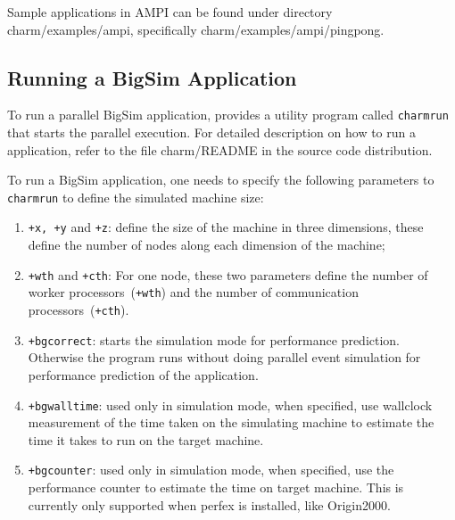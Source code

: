 Sample applications in AMPI can be found under directory
        charm/examples/ampi, specifically charm/examples/ampi/pingpong.

        \subsection{Running a BigSim Application}

        To run a parallel BigSim application, \charmpp{} provides a utility program
        called {\tt charmrun} that starts the parallel execution.
For detailed description on how to run a \charmpp{} application, 
refer to the file charm/README in the source code distribution.

        To run a BigSim application, one needs to specify the following parameters to 
        {\tt charmrun} to define the simulated machine size:
\begin{enumerate}
\item {\tt +x, +y} and {\tt +z}:  define the size of the machine in three dimensions, these define the number of nodes along each dimension of the machine;
\item {\tt +wth} and {\tt +cth}:  For one node, these two parameters define the number of worker processors~({\tt +wth}) and the number of communication processors~({\tt +cth}).
\item {\tt +bgcorrect}: starts the simulation mode for performance prediction. Otherwise the program runs without doing parallel event simulation for performance prediction of the application.
\item {\tt +bgwalltime}: used only in simulation mode, when specified, use wallclock measurement of the time taken on the simulating machine to estimate the time it takes to run on the target machine.
\item {\tt +bgcounter}:  used only in simulation mode, when specified, use the performance counter to estimate the time on target machine. This is currently only supported when perfex is installed, like Origin2000.
\end{enumerate}

